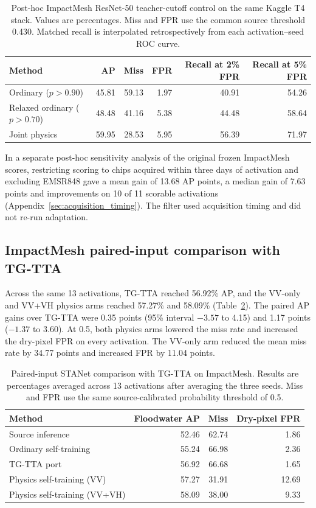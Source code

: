 \begin{table}[pos=t]
\centering
\caption{Post-hoc ImpactMesh ResNet-50 teacher-cutoff control on the same Kaggle T4 stack. Values are percentages. Miss and FPR use the common source threshold 0.430. Matched recall is interpolated retrospectively from each activation--seed ROC curve.}
\label{tab:relaxed_control}
\begin{tabular}{@{}lrrrrr@{}}
\toprule
Method & AP & Miss & FPR & Recall at 2\% FPR & Recall at 5\% FPR \\
\midrule
Ordinary ($p>0.90$) & 45.81 & 59.13 & 1.97 & 40.91 & 54.26 \\
Relaxed ordinary ($p>0.70$) & 48.48 & 41.16 & 5.38 & 44.48 & 58.64 \\
Joint physics & 59.95 & 28.53 & 5.95 & 56.39 & 71.97 \\
\bottomrule
\end{tabular}
\end{table}

In a separate post-hoc sensitivity analysis of the original frozen ImpactMesh scores, restricting scoring to chips acquired within three days of activation and excluding EMSR848 gave a mean gain of 13.68 AP points, a median gain of 7.63 points and improvements on 10 of 11 scorable activations (Appendix~\ref{sec:acquisition_timing}). The filter used acquisition timing and did not re-run adaptation.

\subsection{ImpactMesh paired-input comparison with TG-TTA}
\label{sec:matched_tg_tta}
Across the same 13 activations, TG-TTA reached 56.92\% AP, and the VV-only and VV+VH physics arms reached 57.27\% and 58.09\% (Table~\ref{tab:tg_fixed}). The paired AP gains over TG-TTA were 0.35 points (95\% interval $-3.57$ to 4.15) and 1.17 points ($-1.37$ to 3.60). At 0.5, both physics arms lowered the miss rate and increased the dry-pixel FPR on every activation. The VV-only arm reduced the mean miss rate by 34.77 points and increased FPR by 11.04 points.

\begin{table}[pos=t]
\centering
\caption{Paired-input STANet comparison with TG-TTA on ImpactMesh. Results are percentages averaged across 13 activations after averaging the three seeds. Miss and FPR use the same source-calibrated probability threshold of 0.5.}
\label{tab:tg_fixed}
\begin{tabular}{@{}lrrr@{}}
\toprule
Method & Floodwater AP & Miss & Dry-pixel FPR \\
\midrule
Source inference & 52.46 & 62.74 & 1.86 \\
Ordinary self-training & 55.24 & 66.98 & 2.36 \\
TG-TTA port & 56.92 & 66.68 & 1.65 \\
Physics self-training (VV) & 57.27 & 31.91 & 12.69 \\
Physics self-training (VV+VH) & 58.09 & 38.00 & 9.33 \\
\bottomrule
\end{tabular}
\end{table}

